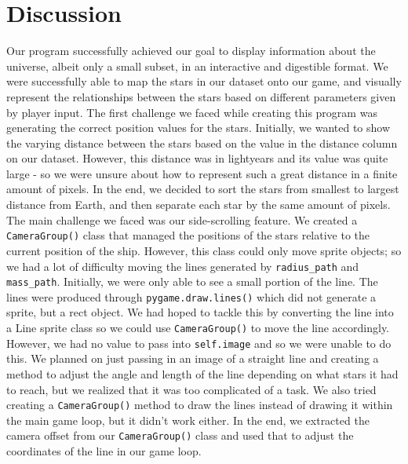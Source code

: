\documentclass[fontsize=11pt]{article}
\begin{document}
\section*{Discussion}
Our program successfully achieved our goal to display information about the universe, albeit only a small subset, in an interactive and digestible format. We were successfully able to map the stars in our dataset onto our game, and visually represent the relationships between the stars based on different parameters given by player input.
The first challenge we faced while creating this program was generating the correct position values for the stars. Initially, we wanted to show the varying distance between the stars based on the value in the distance column on our dataset. However, this distance was in lightyears and its value was quite large - so we were unsure about how to represent such a great distance in a finite amount of pixels. In the end, we decided to sort the stars from smallest to largest distance from Earth, and then separate each star by the same amount of pixels. \\

The main challenge we faced was our side-scrolling feature. We created a \texttt{CameraGroup()} class that managed the positions of the stars relative to the current position of the ship. However, this class could only move sprite objects; so we had a lot of difficulty moving the lines generated by \texttt{radius\_path} and \texttt{mass\_path}. Initially, we were only able to see a small portion of the line. The lines were produced through \texttt{pygame.draw.lines()} which did not generate a sprite, but a rect object. We had hoped to tackle this by converting the line into a Line sprite class so we could use \texttt{CameraGroup()} to move the line accordingly. However, we had no value to pass into \texttt{self.image} and so we were unable to do this. We planned on just passing in an image of a straight line and creating a method to adjust the angle and length of the line depending on what stars it had to reach, but we realized that it was too complicated of a task. We also tried creating a \texttt{CameraGroup()} method to draw the lines instead of drawing it within the main game loop, but it didn’t work either. In the end, we extracted the camera offset from our \texttt{CameraGroup()} class and used that to adjust the coordinates of the line in our game loop.\\
\end{document}
